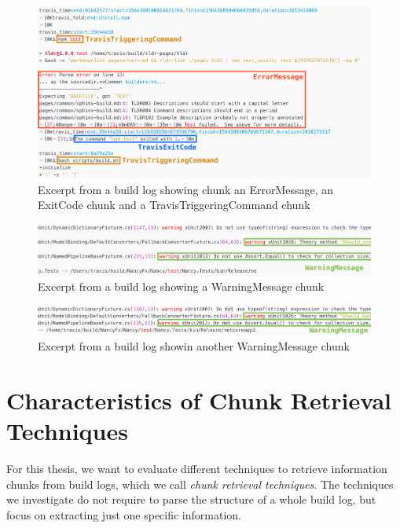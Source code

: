 \documentclass[\myrootdir/main.tex]{subfiles}
\begin{document}
\begin{figure}[htbp]
	\centering
	\includegraphics[width=\textwidth, clip]{img/log32.png}
	\caption{Excerpt from a build log showing chunk an ErrorMessage, an ExitCode chunk and a TravisTriggeringCommand chunk}
	\label{fig:log-3}
\end{figure}
\begin{figure}[htbp]
	\centering
	\includegraphics[width=\textwidth, clip]{img/log42.png}
	\caption{Excerpt from a build log showing a WarningMessage chunk}
	\label{fig:log-4}
\end{figure}
\begin{figure}[htbp]
	\centering
	\includegraphics[width=\textwidth, clip]{img/log52.png}
	\caption{Excerpt from a build log showin another WarningMessage chunk}
	\label{fig:log-5}
\end{figure}


\section{Characteristics of Chunk Retrieval Techniques}
\label{sec:blirt}
For this thesis, we want to evaluate different techniques to retrieve information chunks from build logs, which we call \emph{chunk retrieval techniques}.
The techniques we investigate do not require to parse the structure of a whole build log, but focus on extracting just one specific information.
\end{document}
